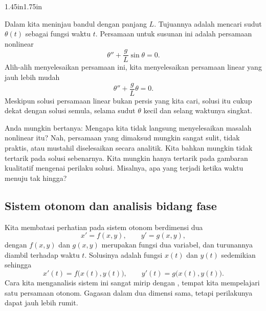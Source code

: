 \begin{mywrapfigsimp}{1.45in}{1.75in}
\noindent
{}
\end{mywrapfigsimp}
Dalam  kita meninjau bandul dengan
panjang $L$. Tujuannya adalah mencari sudut $\theta(t)$ sebagai
fungsi waktu $t$. Persamaan untuk susunan ini adalah
persamaan nonlinear
\begin{equation*}
\theta'' + \frac{g}{L} \sin \theta = 0 .
\end{equation*}
Alih-alih menyelesaikan persamaan ini, kita menyelesaikan persamaan linear yang
jauh lebih mudah
\begin{equation*}
\theta'' + \frac{g}{L} \theta = 0 .
\end{equation*}
Meskipun solusi persamaan linear bukan persis yang kita
cari, solusi itu cukup dekat dengan solusi semula, selama
sudut $\theta$ kecil dan selang waktunya singkat.

Anda mungkin bertanya: Mengapa kita tidak langsung menyelesaikan masalah nonlinear itu? Nah,
persamaan yang dimaksud mungkin sangat sulit, tidak praktis, atau mustahil diselesaikan
secara analitik. Kita bahkan mungkin
tidak tertarik pada solusi sebenarnya.
Kita mungkin hanya tertarik
pada gambaran kualitatif mengenai perilaku solusi. Misalnya,
apa yang terjadi ketika waktu menuju tak hingga?


\subsection{Sistem otonom dan analisis bidang fase}

Kita membatasi perhatian pada sistem otonom berdimensi dua
\begin{equation*}
x' = f(x,y) , \qquad y' = g(x,y) ,
\end{equation*}
dengan $f(x,y)$ dan $g(x,y)$ merupakan fungsi dua variabel, dan
turunannya diambil terhadap waktu $t$. Solusinya adalah
fungsi $x(t)$ dan $y(t)$ sedemikian sehingga
\begin{equation*}
x'(t) = f\bigl(x(t),y(t)\bigr), \qquad
y'(t) = g\bigl(x(t),y(t)\bigr) .
\end{equation*}
Cara kita menganalisis sistem ini sangat mirip dengan
, tempat kita mempelajari satu persamaan otonom. Gagasan
dalam dua dimensi sama, tetapi perilakunya dapat
jauh lebih rumit.


